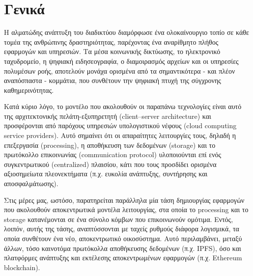 \section{Γενικά}\label{section:1-1-general}

Η αλματώδης ανάπτυξη του διαδικτύου διαμόρφωσε ένα ολοκαίνουργιο τοπίο σε κάθε τομέα της ανθρώπινης δραστηριότητας, παρέχοντας ένα αναρίθμητο πλήθος εφαρμογών και υπηρεσιών. Τα μέσα κοινωνικής δικτύωσης,
το ηλεκτρονικό ταχυδρομείο, η ψηφιακή ειδησεογραφία, ο διαμοιρασμός αρχείων και
οι υπηρεσίες πολυμέσων ροής, αποτελούν μονάχα ορισμένα από τα σημαντικότερα - και πλέον αναπόσπαστα - κομμάτια,
που συνθέτουν την ψηφιακή πτυχή της σύγχρονης καθημερινότητας. 

Κατά κύριο λόγο, το μοντέλο που ακολουθούν οι παραπάνω τεχνολογίες είναι αυτό της αρχιτεκτονικής πελάτη-εξυπηρετητή (client–server architecture) και προσφέρονται από παρόχους υπηρεσιών υπολογιστικού νέφους (cloud computing service providers). Αυτό σημαίνει ότι οι απαραίτητες λειτουργίες τους, δηλαδή η επεξεργασία (processing), η αποθήκευση των δεδομένων (storage) και το πρωτόκολλο επικοινωνίας (communication protocol) υλοποιούνται επί ενός συγκεντρωτικού (centralized) πλαισίου, κάτι που τους προσδίδει ορισμένα αξιοσημείωτα πλεονεκτήματα (π.χ. ευκολία ανάπτυξης, συντήρησης και αποσφαλμάτωσης).

Στις μέρες μας, ωστόσο, παρατηρείται παράλληλα μία τάση δημιουργίας εφαρμογών που ακολουθούν αποκεντρωτικά μοντέλα λειτουργίας, στα οποία το processing και το storage κατανέμονται σε ένα σύνολο κόμβων που επικοινωνούν ομότιμα. Εντός, λοιπόν, αυτής της τάσης, αναπτύσσονται με ταχείς ρυθμούς διάφορα λογισμικά, τα οποία συνθέτουν ένα νέο, αποκεντρωτικό οικοσύστημα. Αυτό περιλαμβάνει, μεταξύ άλλων, τόσο καινοτόμα πρωτόκολλα αποθήκευσης δεδομένων (π.χ. IPFS), όσο και πλατφόρμες ανάπτυξης και εκτέλεσης αποκεντρωμένων εφαρμογών (π.χ. Ethereum blockchain).

\newpage
